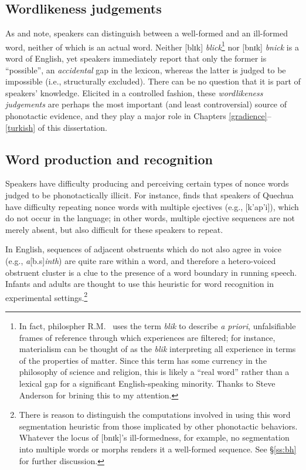 \subsection{Wordlikeness judgements}

As \citet{Halle1962} and \citet{Chomsky1965} note, speakers can distinguish between a well-formed and an ill-formed word, neither of which is an actual word.
Neither [blɪk] \emph{blick}\footnote{
    In fact, philospher R.M.~\citet{Hare1955} uses the term \emph{blik} to describe \emph{a priori}, unfalsifiable frames of reference through which experiences are filtered; for instance, materialism can be thought of as the \emph{blik} interpreting all experience in terms of the properties of matter. 
    Since this term has some currency in the philosophy of science and religion, this is likely a ``real word'' rather than a lexical gap for a significant English-speaking minority. 
    Thanks to Steve Anderson for brining this to my attention.}
nor [bnɪk] \emph{bnick} is a word of English, yet speakers immediately report that only the former is ``possible'', an \emph{accidental} gap in the lexicon, whereas the latter is judged to be impossible (i.e., structurally excluded).
There can be no question that it is part of speakers' knowledge.
Elicited in a controlled fashion, these \emph{wordlikeness judgements} are perhaps the most important (and least controversial) source of phonotactic evidence, and they play a major role in Chapters \ref{gradience}--\ref{turkish} of this dissertation.

\subsection{Word production and recognition}
\label{ss:wpr}

Speakers have difficulty producing \citep[e.g.,][]{Davidson2006a,Davidson2010,Rose2007,Vitevitch1997} and perceiving \citep{Dupoux1999,Kabak2007a,Massaro1983} certain types of nonce words judged to be phonotactically illicit.
For instance, \citet{GallagherInPress} finds that speakers of Quechua have difficulty repeating nonce words with multiple ejectives (e.g., [k'ap'i]), which do not occur in the language; in other words, multiple ejective sequences are not merely absent, but also difficult for these speakers to repeat.

In English, sequences of adjacent obstruents which do not also agree in voice (e.g., \emph{a}[b.s]\emph{inth}) are quite rare within a word, and therefore a hetero-voiced obstruent cluster is a clue to the presence of a word boundary in running speech.
Infants \citep[e.g.,][]{Mattys2001b} and adults \citep{McQueen1998b,Norris1997} are thought to use this heuristic for word recognition in experimental settings.\footnote{
    There is reason to distinguish the computations involved in using this word segmentation heuristic from those implicated by other phonotactic behaviors.
    Whatever the locus of [bnɪk]'s ill-formedness, for example, no segmentation into multiple words or morphs renders it a well-formed sequence.
    See \S\ref{ss:bh} for further discussion.}

